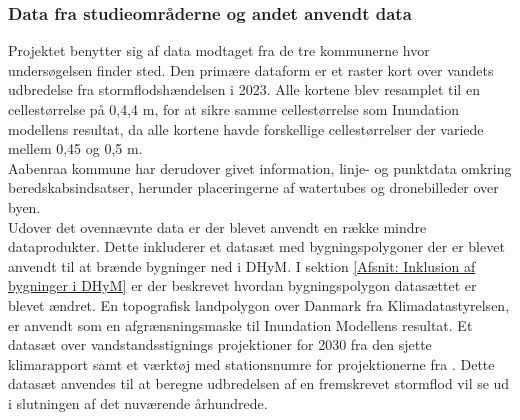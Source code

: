 \subsubsection{Data fra studieområderne og andet anvendt data} \label{Afsnit: Data fra studieområderne og andet anvendt data}
Projektet benytter sig af data modtaget fra de tre kommunerne hvor undersøgelsen finder sted. Den primære dataform er et raster kort over vandets udbredelse fra stormflodshændelsen i 2023. Alle kortene blev resamplet til en cellestørrelse på 0,4,4 m, for at sikre samme cellestørrelse som Inundation modellens resultat, da alle kortene havde forskellige cellestørrelser der variede mellem 0,45 og 0,5 m.\\
Aabenraa kommune har derudover givet information, linje- og punktdata omkring beredskabsindsatser, herunder placeringerne af watertubes og dronebilleder over byen.\\ 

Udover det ovennævnte data er der blevet anvendt en række mindre dataprodukter. 
Dette inkluderer et datasæt med bygningspolygoner der er blevet anvendt til at brænde bygninger ned i DHyM. I sektion \ref{Afsnit: Inklusion af bygninger i DHyM} er der beskrevet hvordan bygningspolygon datasættet er blevet ændret. En topografisk landpolygon over Danmark fra Klimadatastyrelsen, er anvendt som en afgrænsningsmaske til Inundation Modellens resultat. Et datasæt over vandstandsstignings projektioner for 2030 fra den sjette \cite{ipcc_report_AR6, garner_ipcc_2021} klimarapport samt et værktøj med stationsnumre for projektionerne fra \cite{NASA_tool}. Dette datasæt anvendes til at beregne udbredelsen af en fremskrevet stormflod vil se ud i slutningen af det nuværende århundrede.
